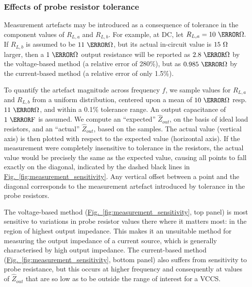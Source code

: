 \documentclass[10pt]{article}
\newcommand{\brieffiglink}[1]{\hyperref[#1]{Fig.~\ref*{#1}}}
\begin{document}
\subsubsection{Effects of probe resistor tolerance}
\label{sec:probe_resistor_effects}

Measurement artefacts may be introduced as a consequence of tolerance in the component values of $R_{L,a}$ and $R_{L,b}$. For example, at DC, let $R_{L,a}=10~\kilo\ohm.$ If $R_{L,b}$ is assumed to be $11~\kilo\ohm$, but its actual in-circuit value is $15~\ohm$ larger, then a $1~\mega\ohm$ output resistance will be reported as $2.8~\mega\ohm$ by the voltage-based method (a relative error of 280\%), but as $0.985~\mega\ohm$ by the current-based method (a relative error of only 1.5\%).

To quantify the artefact magnitude across frequency $f$, we sample values for $R_{L,a}$ and $R_{L,b}$ from a uniform distribution, centered upon a mean of $10~\kilo\ohm$ resp. $11~\kilo\ohm$, and within a 0.1\% tolerance range. An output capacitance of $1~\nano\farad$ is assumed. We compute an ``expected'' $\hat{Z}_{out}$, on the basis of ideal load resistors, and an ``actual'' $\hat{Z}_{out}$, based on the samples. The actual value (vertical axis) is then plotted with respect to the expected value (horizontal axis). If the measurement were completely insensitive to tolerance in the resistors, the actual value would be precisely the same as the expected value, causing all points to fall exactly on the diagonal, indicated by the dashed black lines in \brieffiglink{fig:measurement_sensitivity}. Any vertical offset between a point and the diagonal corresponds to the measurement artefact introduced by tolerance in the probe resistors.

The voltage-based method (\brieffiglink{fig:measurement_sensitivity}, top panel) is most sensitive to variations in probe resistor values there where it matters most: in the region of highest output impedance. This makes it an unsuitable method for measuring the output impedance of a current source, which is generally characterised by high output impedance. The current-based method (\brieffiglink{fig:measurement_sensitivity}, bottom panel) also suffers from sensitivity to probe resistance, but this occurs at higher frequency and consequently at values of $\hat{Z}_{out}$ that are so low as to be outside the range of interest for a VCCS.


\end{document}
